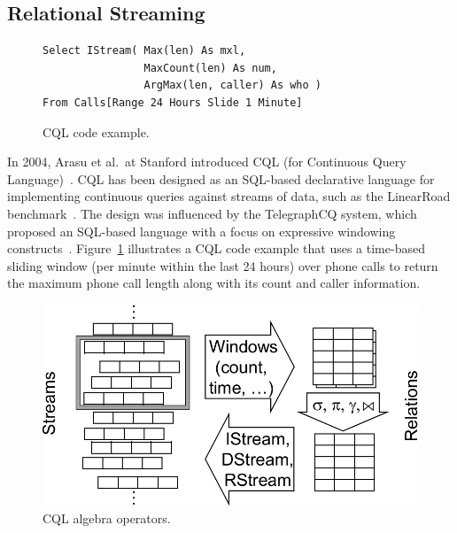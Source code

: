 \subsection{Relational Streaming}\label{sec:sql} %

\begin{figure}[!h]
\begin{lstlisting}[morekeywords={Select,IStream,As,From,Range,Slide}]
Select IStream( Max(len) As mxl,
                MaxCount(len) As num,
                ArgMax(len, caller) As who )
From Calls[Range 24 Hours Slide 1 Minute]
\end{lstlisting}
\vspace*{-4mm}
\caption{\label{fig:cql}CQL code example.}
\end{figure}

In 2004, Arasu et al.\ at Stanford introduced \textsf{CQL} (for Continuous
Query Language)~\cite{arasu_widom_2004}. CQL has been designed as an
SQL-based declarative language for implementing continuous queries
against streams of data, such as the LinearRoad
benchmark~\cite{arasu_et_al_2004}. The design was influenced by the
\textsf{TelegraphCQ} system, which proposed an SQL-based language with a
focus on expressive windowing
constructs~\cite{chandrasekaran_et_al_2003}.
Figure~\ref{fig:cql} illustrates a CQL code example that
uses a time-based sliding window (per minute within the last 24 hours) over
phone calls to return the maximum phone call length along with its
count and caller information.

\begin{figure}[!h]
\centerline{\includegraphics[scale=0.45]{cqlops.pdf}}
\vspace*{-4mm}
\caption{\label{fig:cqlops}CQL algebra operators.}
\end{figure}

